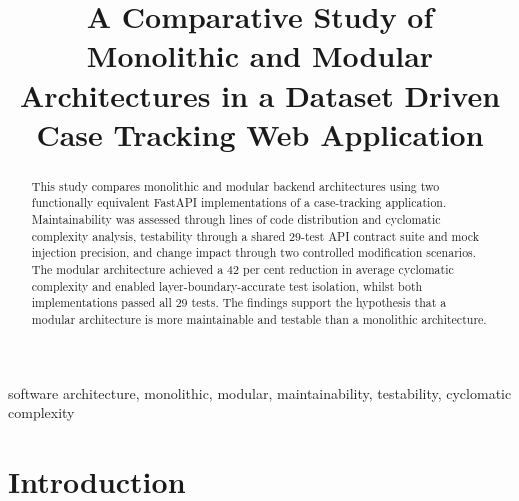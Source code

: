 \documentclass[conference]{IEEEtran}
\begin{document}
\title{A Comparative Study of Monolithic and Modular Architectures in a Dataset Driven Case Tracking Web Application\\
}

\author{
}

\maketitle

\begin{abstract}
This study compares monolithic and modular backend architectures using two functionally equivalent FastAPI implementations of a case-tracking application. Maintainability was assessed through lines of code distribution and cyclomatic complexity analysis, testability through a shared 29-test API contract suite and mock injection precision, and change impact through two controlled modification scenarios. The modular architecture achieved a 42 per cent reduction in average cyclomatic complexity and enabled layer-boundary-accurate test isolation, whilst both implementations passed all 29 tests. The findings support the hypothesis that a modular architecture is more maintainable and testable than a monolithic architecture.
\end{abstract}

\begin{IEEEkeywords}
software architecture, monolithic, modular, maintainability, testability, cyclomatic complexity
\end{IEEEkeywords}

\section{Introduction}
\end{document}
